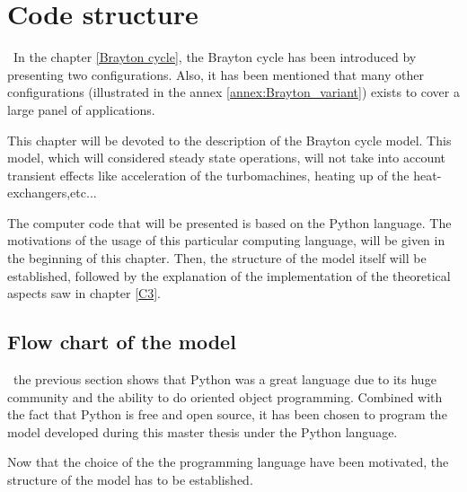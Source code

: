 \graphicspath{{Chapter_5_-_Code_structure/Images/}}
\chapter{Code structure}
\quad\, In the chapter \ref{Brayton cycle}, the Brayton cycle has been introduced by presenting two configurations. Also, it has been mentioned that many other configurations (illustrated in the annex \ref{annex:Brayton_variant}) exists to cover a large panel of applications. 

This chapter will be devoted to the description of the  Brayton cycle model. This model, which will considered steady state operations, will not take into account transient effects like acceleration of the turbomachines, heating up of the heat-exchangers,etc...

The computer code that will be presented is based on the Python language\citep{van1995python}. The motivations of the usage of this particular computing language, will be given in the beginning of this chapter. Then, the structure of the model itself will be established, followed by the explanation of the implementation of the theoretical aspects saw in chapter \ref{C3}.



\section{Flow chart of the model}
\quad\, the previous section shows that Python was a great language due to its huge community and the ability to do oriented object programming. Combined with the fact that Python is free and open source, it has been chosen to program the model developed during this master thesis under the Python language.

Now that the choice of the the programming language have been motivated, the structure of the model has to be established.